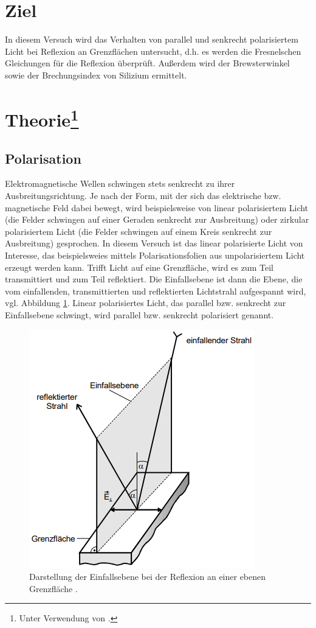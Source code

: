\section{Ziel}
In diesem Versuch wird das Verhalten von parallel und senkrecht polarisiertem Licht bei Reflexion an Grenzflächen untersucht,
d.h. es werden die Fresnelschen Gleichungen für die Reflexion überprüft.
Außerdem wird der Brewsterwinkel sowie der Brechungsindex von Silizium ermittelt.


\section[Theorie]{Theorie\footnote[1]{Unter Verwendung von \cite{man:v407}.}}

\subsection{Polarisation}
Elektromagnetische Wellen schwingen stets senkrecht zu ihrer Ausbreitungsrichtung.
Je nach der Form, mit der sich das elektrische bzw. magnetische Feld dabei bewegt,
wird beispielsweise von linear polarisiertem Licht (die Felder schwingen auf einer Geraden senkrecht zur Ausbreitung)
oder zirkular polarisiertem Licht (die Felder schwingen auf einem Kreis senkrecht zur Ausbreitung) gesprochen.
In diesem Versuch ist das linear polarisierte Licht von Interesse, das beispielsweies mittels Polarisationsfolien aus unpolarisiertem Licht erzeugt werden kann.
Trifft Licht auf eine Grenzfläche, wird es zum Teil transmittiert und zum Teil reflektiert.
Die Einfallsebene ist dann die Ebene, die vom einfallenden, transmittierten und reflektierten Lichtstrahl aufgespannt wird, vgl. Abbildung \ref{fig:einfallsebene}.
Linear polarisiertes Licht, das parallel bzw. senkrecht zur Einfallsebene schwingt, wird parallel bzw. senkrecht polarisiert genannt.


\begin{figure}[H]
    \centering
    \includegraphics[height = 6 cm]{Abbildungen/einfallsebene.png}
    \caption{Darstellung der Einfallsebene bei der Reflexion an einer ebenen Grenzfläche \cite{man:v407}.}
    \label{fig:einfallsebene}
\end{figure}

